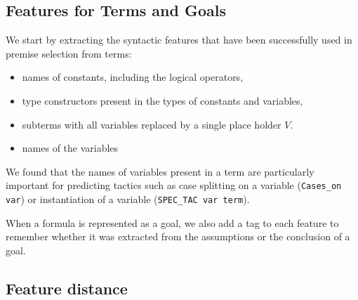 \documentclass[runningheads,a4paper,draft]{svjour3}
\def\sml{\textsf{SML}\xspace}
\begin{document}





\subsection{Features for Terms and Goals}\label{sec:features}

We start by extracting the syntactic features that have been successfully used 
in premise selection from terms:
\begin{itemize}
\item names of constants, including the logical operators,
\item type constructors present in the types of constants and variables,
\item subterms with all variables replaced by a single place holder $V$.
\item names of the variables
\end{itemize}


We found that the names of variables present in a term are particularly 
important for predicting tactics such as 
case splitting on a variable 
(\texttt{Cases\_on var}) or instantiation of a variable 
(\texttt{SPEC\_TAC var term}). 


When a formula is represented as a goal, we also add a tag to each 
feature to remember whether it was extracted from the assumptions or the 
conclusion of a goal.




\subsection{Feature distance}\label{sec:predictions}
\end{document}

